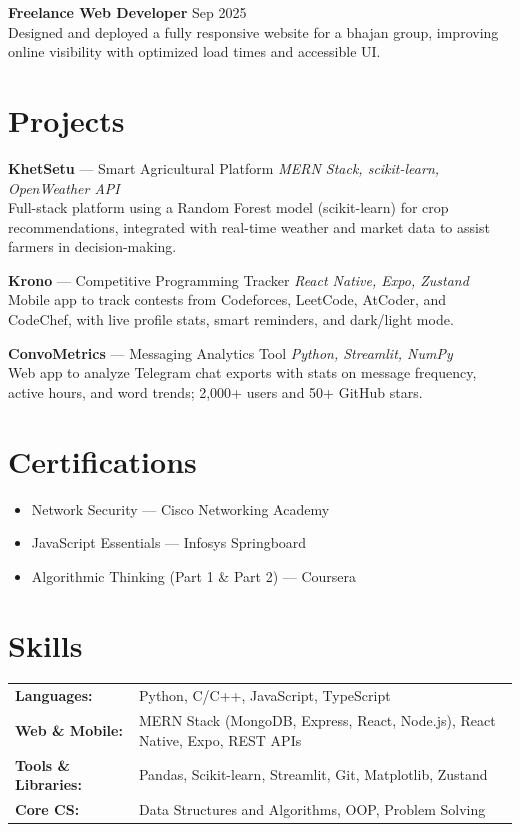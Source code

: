 \documentclass[a4paper,10pt]{article}
\begin{document}
\textbf{Freelance Web Developer} \hfill Sep 2025 \\
Designed and deployed a fully responsive website for a bhajan group, improving online visibility with optimized load times and accessible UI.

\section*{Projects}
\textbf{KhetSetu} — Smart Agricultural Platform \hfill \textit{MERN Stack, scikit-learn, OpenWeather API} \href{https://github.com/MeetThakur/Khetsetu}{\faGithub}\\
Full-stack platform using a Random Forest model (scikit-learn) for crop recommendations, integrated with real-time weather and market data to assist farmers in decision-making.

\textbf{Krono} — Competitive Programming Tracker \hfill \textit{React Native, Expo, Zustand} \href{https://github.com/MeetThakur/Krono}{\faGithub}\\
Mobile app to track contests from Codeforces, LeetCode, AtCoder, and CodeChef, with live profile stats, smart reminders, and dark/light mode.

\textbf{ConvoMetrics} — Messaging Analytics Tool \hfill \textit{Python, Streamlit, NumPy} \href{https://github.com/MeetThakur/ConvoMetrics}{\faGithub}\\
Web app to analyze Telegram chat exports with stats on message frequency, active hours, and word trends; 2,000+ users and 50+ GitHub stars.

\section*{Certifications}
\begin{itemize}[leftmargin=0.4cm, itemsep=0pt, topsep=2pt]
    \item Network Security — Cisco Networking Academy
    \item JavaScript Essentials — Infosys Springboard
    \item Algorithmic Thinking (Part 1 \& Part 2) — Coursera
\end{itemize}

\section*{Skills}
\begin{tabularx}{\textwidth}{@{}lX@{}}
\textbf{Languages:} & Python, C/C++, JavaScript, TypeScript \\
\textbf{Web \& Mobile:} & MERN Stack (MongoDB, Express, React, Node.js), React Native, Expo, REST APIs \\
\textbf{Tools \& Libraries:} & Pandas, Scikit-learn, Streamlit, Git, Matplotlib, Zustand \\
\textbf{Core CS:} & Data Structures and Algorithms, OOP, Problem Solving \\
\end{tabularx}
\end{document}
